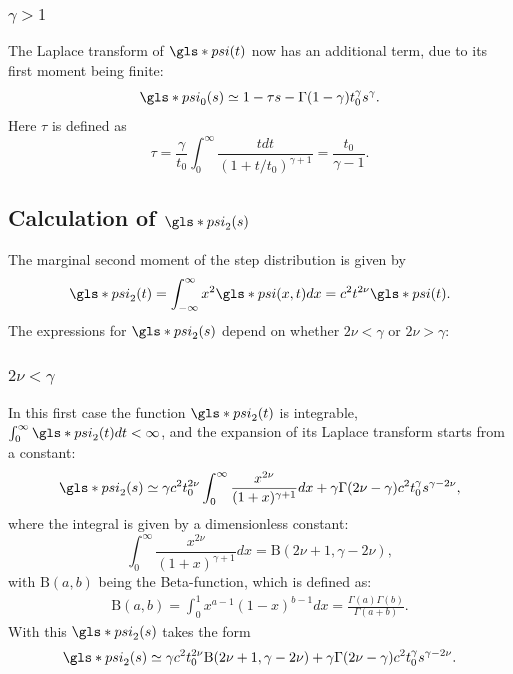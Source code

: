 \subsubsection*{$ \gamma>1$}
The Laplace transform of $\gls*{psi}(t)$ now has an additional term, due to its first moment being finite:
\begin{equation}
\gls*{psi}_{0}(s) \simeq 1 - \tau s - \Gamma(1-\gamma ) t_0^\gamma s^\gamma.
\label{eqn:psi0GammaBig}
\end{equation}  
Here $\tau$ is defined as 
\begin{equation}
 \tau = \frac{\gamma}{t_0} \int_0^\infty \frac{t dt}{(1+t/t_0)^{\gamma +1}} = 
 \frac{t_0}{\gamma-1} . \label{eq:tau}
\end{equation}

\subsection*{Calculation of $\gls*{psi}_2(s)$}
The marginal second moment of the step distribution is given by  
\begin{align}
 \gls*{psi}_2(t) = \int_{-\infty}^\infty x^2 \gls*{psi}(x,t) dx = c^2 t^{2 \nu} \gls*{psi}(t).
\end{align}
The expressions for $\gls*{psi}_2(s)$ depend on whether $2 \nu < \gamma $ or $2 \nu > \gamma$:

\subsubsection*{$2\nu<\gamma$} 
In this first case the function $\gls*{psi}_2(t)$ is integrable, $\int_0^\infty \gls*{psi}_2(t) dt < \infty$, and the expansion 
of its Laplace transform starts from a constant:
\begin{equation}
 \gls*{psi}_2(s) \simeq \gamma c^2 t_0^{2\nu}  \int_0^\infty \frac{x^{2\nu}}{(1+x)^{\gamma+1}} dx  + \gamma \Gamma(2\nu-\gamma) c^2t_0^\gamma s^{\gamma-2\nu} ,
\end{equation}
where the integral is given by a dimensionless constant:
\begin{equation}
 \int_0^\infty \frac{x^{2\nu}}{(1+x)^{\gamma+1}} dx = \mathrm{B}(2\nu+1,\gamma-2\nu), \label{eqn:I1}
\end{equation}
with $\mathrm{B}(a,b)$ being the Beta-function, which is defined as:
%
\begin{align}
\mathrm{B}(a,b) = \int_{0}^{1} x^{a-1}(1-x)^{b-1} dx = \frac{\Gamma(a)\Gamma(b)}{\Gamma(a+b)} .
\end{align}
%
With this $\gls*{psi}_2(s)$ takes the form 
%
\begin{align}
\gls*{psi}_2(s) \simeq \gamma c^2 t_0^{2\nu}  \mathrm{B}(2\nu+1,\gamma-2\nu)  + \gamma \Gamma(2\nu-\gamma) c^2t_0^\gamma s^{\gamma-2\nu} \label{eqn:psi2NuSmall} .
\end{align}

